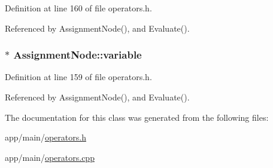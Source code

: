 Definition at line 160 of file operators.\+h.



Referenced by Assignment\+Node(), and Evaluate().

\subsubsection[{\texorpdfstring{variable}{variable}}]{$\ast$ Assignment\+Node\+::variable\hspace{0.3cm}{\ttfamily [private]}}\hypertarget{classAssignmentNode_ac22933c48c43391f969b412158c729dc}{}\label{classAssignmentNode_ac22933c48c43391f969b412158c729dc}


Definition at line 159 of file operators.\+h.



Referenced by Assignment\+Node(), and Evaluate().



The documentation for this class was generated from the following files\+:\begin{DoxyCompactItemize}
\item 
app/main/\hyperlink{operators_8h}{operators.\+h}\item 
app/main/\hyperlink{operators_8cpp}{operators.\+cpp}\end{DoxyCompactItemize}

